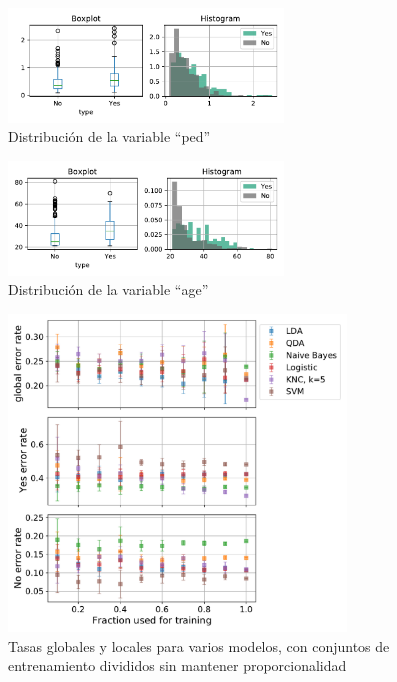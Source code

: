 \documentclass[11pt]{article}
\begin{document}
\begin{figure}[H]
    \centering
    \includegraphics[width = 0.65\textwidth]{1-ped-dist.pdf}
    \caption{Distribución de la variable ``ped''}
    \label{1-ped-dist}
\end{figure}
\begin{figure}[H]
    \centering
    \includegraphics[width = 0.65\textwidth]{1-age-dist.pdf}
    \caption{Distribución de la variable ``age''}
    \label{1-age-dist}
\end{figure}
\begin{figure}[H]
    \centering
    \includegraphics[width = 0.8\textwidth]{1-gen-sizeDependence.pdf}
    \caption{Tasas globales y locales para varios modelos, con conjuntos de entrenamiento divididos sin mantener proporcionalidad}
    \label{1-gen-sizeDependence}
\end{figure}
\end{document}
